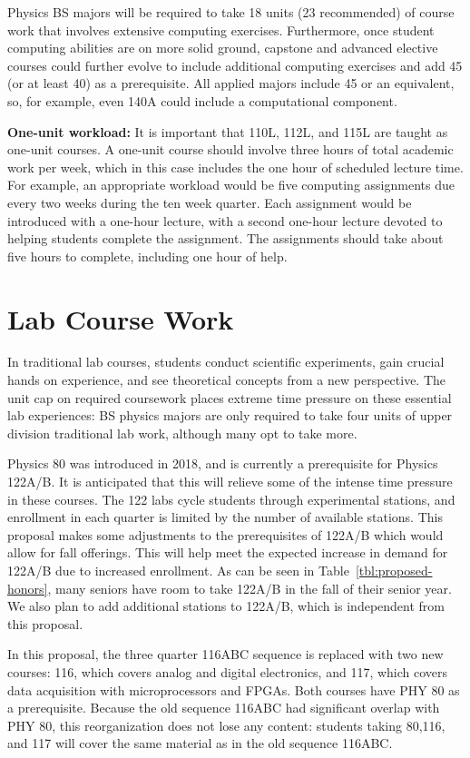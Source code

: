 \documentclass[12pt]{article}
\begin{document}
Physics BS majors will be required to take 18 units (23 recommended)
of course work that involves extensive computing exercises.
Furthermore, once student computing abilities are on more solid
ground, capstone and advanced elective courses could further evolve to
include additional computing exercises and add 45 (or at least 40) as
a prerequisite.  All applied majors include 45 or an equivalent, so,
for example, even 140A could include a computational component.

{\bf One-unit workload: }It is important that 110L, 112L, and 115L are
taught as one-unit courses.  A one-unit course should involve three
hours of total academic work per week, which in this case includes the
one hour of scheduled lecture time.  For example, an appropriate
workload would be five computing assignments due every two weeks
during the ten week quarter.  Each assignment would be introduced with
a one-hour lecture, with a second one-hour lecture devoted to helping
students complete the assignment.  The assignments should take about
five hours to complete, including one hour of help.

\section{Lab Course Work}
\label{sec:labs}

In traditional lab courses, students conduct scientific experiments,
gain crucial hands on experience, and see theoretical concepts from a
new perspective.  The unit cap on required coursework places extreme
time pressure on these essential lab experiences: BS physics majors
are only required to take four units of upper division traditional lab
work, although many opt to take more.

Physics 80 was introduced in 2018, and is currently a prerequisite for
Physics 122A/B.  It is anticipated that this will relieve some of the
intense time pressure in these courses.  The 122 labs cycle students
through experimental stations, and enrollment in each quarter is
limited by the number of available stations.  This proposal makes some
adjustments to the prerequisites of 122A/B which would allow for fall
offerings.  This will help meet the expected increase in demand for
122A/B due to increased enrollment.  As can be seen in
Table~\ref{tbl:proposed-honors}, many seniors have room to take 122A/B
in the fall of their senior year.  We also plan to add additional
stations to 122A/B, which is independent from this proposal.

In this proposal, the three quarter 116ABC sequence is replaced with
two new courses:  116, which covers analog and digital electronics, and
117, which covers data acquisition with microprocessors and FPGAs.
Both courses have PHY 80 as a prerequisite.  Because the old sequence
116ABC had significant overlap with PHY 80, this reorganization does
not lose any content: students taking 80,116, and 117 will cover the
same material as in the old sequence 116ABC.
\end{document}
